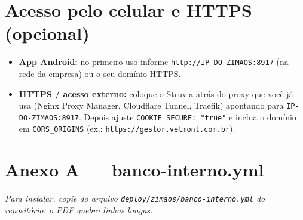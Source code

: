 \documentclass[
  10pt,
]{article}
\providecommand{\tightlist}{%
  \setlength{\itemsep}{0pt}\setlength{\parskip}{0pt}}
\renewenvironment{quote}{\begin{oldquote}\small\itshape}{\end{oldquote}}
\begin{document}
\hypertarget{acesso-pelo-celular-e-https-opcional}{%
\section{Acesso pelo celular e HTTPS
(opcional)}\label{acesso-pelo-celular-e-https-opcional}}

\begin{itemize}
\tightlist
\item
  \textbf{App Android:} no primeiro uso informe
  \texttt{http://IP-DO-ZIMAOS:8917} (na rede da empresa) ou o seu
  domínio HTTPS.
\item
  \textbf{HTTPS / acesso externo:} coloque o Struvia atrás do proxy que
  você já usa (Nginx Proxy Manager, Cloudflare Tunnel, Traefik)
  apontando para \texttt{IP-DO-ZIMAOS:8917}. Depois ajuste
  \texttt{COOKIE\_SECURE:\ "true"} e inclua o domínio em
  \texttt{CORS\_ORIGINS} (ex.: \texttt{https://gestor.velmont.com.br}).
\end{itemize}

\hypertarget{anexo-a-banco-interno.yml}{%
\section{Anexo A ---
banco-interno.yml}\label{anexo-a-banco-interno.yml}}

\begin{quote}
Para instalar, copie do arquivo \texttt{deploy/zimaos/banco-interno.yml}
do repositório: o PDF quebra linhas longas.
\end{quote}
\end{document}

